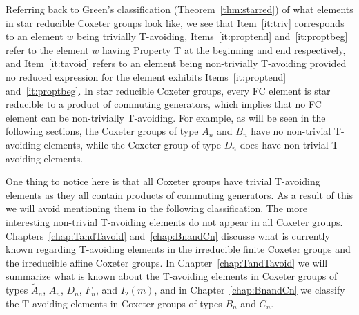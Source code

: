 Referring back to Green's classification (Theorem~\ref{thm:starred}) of what elements in star reducible Coxeter groups look like, we see that Item~\ref{it:triv} corresponds to an element $w$ being trivially T-avoiding, Items~\ref{it:proptend} and~\ref{it:proptbeg} refer to the element $w$ having Property T at the beginning and end respectively, and Item~\ref{it:tavoid} refers to an element being non-trivially T-avoiding provided no reduced expression for the element exhibits Items~\ref{it:proptend} and~\ref{it:proptbeg}. In star reducible Coxeter groups, every FC element is star reducible to a product of commuting generators, which implies that no FC element can be non-trivially T-avoiding. For example, as will be seen in the following sections, the Coxeter groups of type $A_n$ and $B_n$ have no non-trivial T-avoiding elements, while the Coxeter group of type $D_n$ does have non-trivial T-avoiding elements. 




One thing to notice here is that all Coxeter groups have trivial T-avoiding elements as they all contain products of commuting generators. As a result of this we will avoid mentioning them in the following classification. The more interesting non-trivial T-avoiding elements do not appear in all Coxeter groups. Chapters~\ref{chap:TandTavoid} and~\ref{chap:BnandCn}  discusse what is currently known regarding T-avoiding elements in the irreducible finite Coxeter groups and the irreducible affine Coxeter groups. In Chapter~\ref{chap:TandTavoid} we will summarize what is known about the T-avoiding elements in Coxeter groups of types $\widetilde{A}_n$, $A_n$, $D_n$, $F_n$, and $I_2(m)$, and in Chapter~\ref{chap:BnandCn} we classify the T-avoiding elements in Coxeter groups of types $B_n$ and $\widetilde{C}_n$. 


